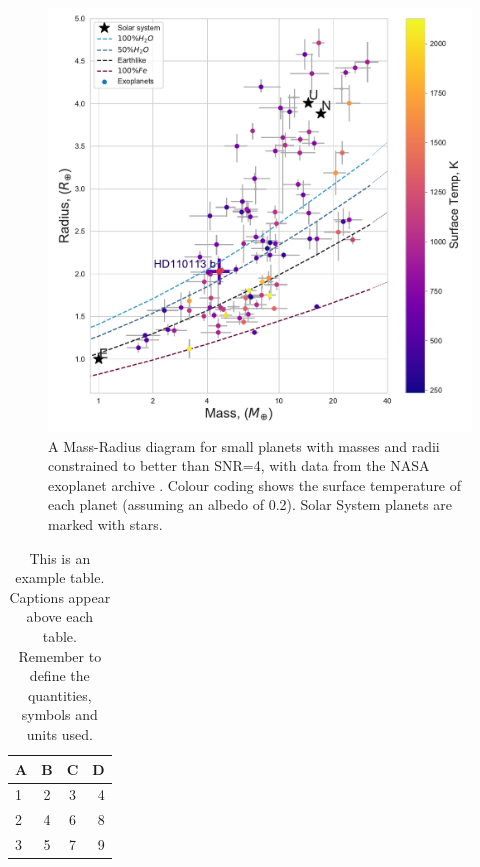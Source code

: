\documentclass[fleqn,usenatbib]{mnras}
\begin{document}
\begin{figure}
	\includegraphics[width=\columnwidth]{MR_Diagram_sm}
    \caption{A Mass-Radius diagram for small planets with masses and radii constrained to better than SNR=4, with data from the NASA exoplanet archive \citep{akeson2013nasa}. Colour coding shows the surface temperature of each planet (assuming an albedo of 0.2). Solar System planets are marked with stars.}
    \label{fig:example_figure}
\end{figure}

\begin{table}
	\centering
	\caption{This is an example table. Captions appear above each table.
	Remember to define the quantities, symbols and units used.}
	\label{tab:example_table}
	\begin{tabular}{lccr} %
		\hline
		A & B & C & D\\
		\hline
		1 & 2 & 3 & 4\\
		2 & 4 & 6 & 8\\
		3 & 5 & 7 & 9\\
		\hline
	\end{tabular}
\end{table}
\end{document}
